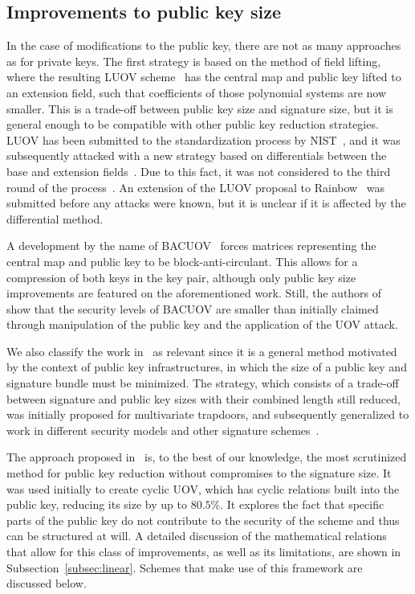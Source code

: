\documentclass[12pt, a4paper, oneside]{memoir}
\theoremstyle{definition}
\begin{document}
\subsection{Improvements to public key size}\label{subsec:pub}

In the case of modifications to the public key, there are not as many approaches as for private keys. The first strategy is based on the method of field lifting, where the resulting LUOV scheme~\cite{Beullens:201712} has the central map and public key lifted to an extension field, such that coefficients of those polynomial systems are now smaller. This is a trade-off between public key size and signature size, but it is general enough to be compatible with other public key reduction strategies. LUOV has been submitted to the standardization process by NIST~\cite{Alagic:201901}, and it was subsequently attacked with a new strategy based on differentials between the base and extension fields~\cite{Ding:201912}. Due to this fact, it was not considered to the third round of the process~\cite[Sec.~3.24]{Alagic:202007}. An extension of the LUOV proposal to Rainbow~\cite{Duong:202003} was submitted before any attacks were known, but it is unclear if it is affected by the differential method.

A development by the name of BACUOV~\cite{Szepieniec:201908} forces matrices representing the central map and public key to be block-anti-circulant. This allows for a compression of both keys in the key pair, although only public key size improvements are featured on the aforementioned work. Still, the authors of~\cite{Furue:202004} show that the security levels of BACUOV are smaller than initially claimed through manipulation of the public key and the application of the UOV attack.

We also classify the work in~\cite{Szepieniec:201706} as relevant since it is a general method motivated by the context of public key infrastructures, in which the size of a public key and signature bundle must be minimized. The strategy, which consists of a trade-off between signature and public key sizes with their combined length still reduced, was initially proposed for multivariate trapdoors, and subsequently generalized to work in different security models and other signature schemes~\cite{Beullens:201808}.

The approach proposed in~\cite{Petzoldt:201006} is, to the best of our knowledge, the most scrutinized method for public key reduction without compromises to the signature size. It was used initially to create cyclic UOV, which has cyclic relations built into the public key, reducing its size by up to $80.5\%$. It explores the fact that specific parts of the public key do not contribute to the security of the scheme and thus can be structured at will. A detailed discussion of the mathematical relations that allow for this class of improvements, as well as its limitations, are shown in Subsection~\ref{subsec:linear}. Schemes that make use of this framework are discussed below. 
\end{document}
